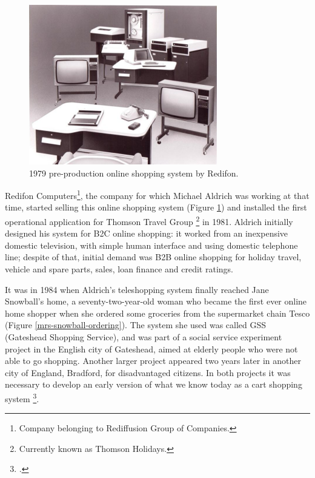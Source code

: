 \begin{figure}[!ht]
\center
\includegraphics[keepaspectratio]{images/pre-production-online-shopping-1979.png}
\caption{1979 pre-production online shopping system by Redifon.}
\label{pre-production-fig}
\end{figure}


Redifon Computers\footnote{Company belonging to Rediffusion Group of Companies.}, the company for which Michael Aldrich was working at that time, started selling this online shopping system (Figure \ref{pre-production-fig}) and installed the first operational application for Thomson Travel Group \footnote{Currently known as Thomson Holidays.} in 1981. Aldrich initially designed his system for B2C online shopping: it worked from an inexpensive domestic television, with simple human interface and using domestic telephone line; despite of that, initial demand was B2B online shopping for holiday travel, vehicle and spare parts, sales, loan finance and credit ratings.

It was in 1984 when Aldrich’s teleshopping system finally reached Jane Snowball’s home, a seventy-two-year-old woman who became the first ever online home shopper when she ordered some groceries from the supermarket chain Tesco (Figure \ref{mrs-snowball-ordering}). The system she used was called GSS (Gateshead Shopping Service), and was part of a social service experiment project in the English city of Gateshead, aimed at elderly people who were not able to go shopping. Another larger project appeared two years later in another city of England, Bradford, for disadvantaged citizens. In both projects it was necessary to develop an early version of what we know today as a cart shopping system \footcite{Ald09}.

